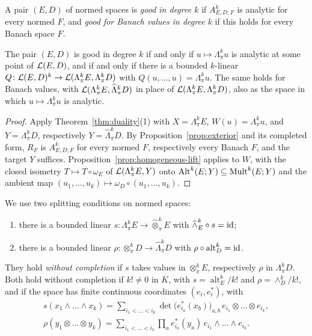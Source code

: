\begin{definition}\label{fib:def:good}
A pair $(E,D)$ of normed spaces is \emph{good in degree $k$} if $A^k_{E,D;F}$ is analytic for every normed $F$, and
\emph{good for Banach values in degree $k$} if this holds for every Banach space $F$.
\end{definition}

\begin{lemma}\label{fib:lem:test}
The pair $(E,D)$ is good in degree $k$ if and only if $u\mapsto\Lambda^k_\pi u$ is analytic at some point of $\mathcal L(E,D)$,
and if and only if there is a bounded $k$\nobreakdash-linear $Q\colon\mathcal L(E,D)^k\to\mathcal L(\Lambda^k_\pi E,\Lambda^k_\pi D)$
with $Q(u,\dots,u)=\Lambda^k_\pi u$. The same holds for Banach values, with $\mathcal L(\Lambda^k_\pi E,\widehat\Lambda^k_\pi D)$
in place of $\mathcal L(\Lambda^k_\pi E,\Lambda^k_\pi D)$, also as the space in which $u\mapsto\Lambda^k_\pi u$ is analytic.
\end{lemma}

\begin{proof}
Apply Theorem~\ref{thm:duality}(1) with $X=\Lambda^k_\pi E$, $W(u)=\Lambda^k_\pi u$, and $Y=\Lambda^k_\pi D$,
respectively $Y=\widehat\Lambda^k_\pi D$. By Proposition~\ref{prop:exterior} and its completed form, $R_F$ is
$A^k_{E,D;F}$ for every normed $F$, respectively every Banach $F$, and the target $Y$ suffices. Proposition~\ref{prop:homogeneous-lift}
applies to $W$, with the closed isometry $T\mapsto T\circ\omega_E$ of $\mathcal L(\Lambda^k_\pi E,Y)$ onto
$\operatorname{Alt}^k(E;Y)\subseteq\operatorname{Mult}^k(E;Y)$ and the ambient map $(u_1,\dots,u_k)\mapsto\omega_D\circ(u_1,\dots,u_k)$.
\end{proof}

We use two splitting conditions on normed spaces:
\begin{enumerate}
\item[$(\mathrm S^k_E)$] there is a bounded linear $s\colon\Lambda^k_\pi E\to\widehat\otimes^k_\pi E$ with
$\widehat\wedge^k_E\circ s=\mathrm{id}$;
\item[$(\mathrm R^k_D)$] there is a bounded linear $\rho\colon\otimes^k_\pi D\to\widehat\Lambda^k_\pi D$ with
$\rho\circ\operatorname{alt}^k_D=\mathrm{id}$.
\end{enumerate}
They hold \emph{without completion} if $s$ takes values in $\otimes^k_\pi E$, respectively $\rho$ in
$\Lambda^k_\pi D$. Both hold without completion if $k!\ne0$ in $K$, with $s=\operatorname{alt}^k_E/k!$ and
$\rho=\wedge^k_D/k!$, and if the space has finite continuous coordinates $(e_i,e^*_i)$, with
\[
 \begin{gathered}
 s(x_1\wedge\dots\wedge x_k)=\sum_{i_1<\dots<i_k}\det\bigl(e^*_{i_a}(x_b)\bigr)_{a,b}\,
 e_{i_1}\otimes\dots\otimes e_{i_k},\\
 \rho(y_1\otimes\dots\otimes y_k)=\sum_{i_1<\dots<i_k}\prod_a e^*_{i_a}(y_a)\,e_{i_1}\wedge\dots\wedge e_{i_k}.
 \end{gathered}
\]

